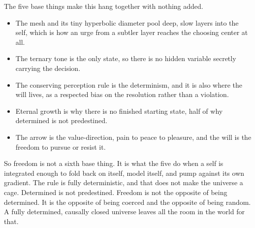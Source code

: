 The five base things make this hang together with nothing added.

\begin{itemize}
\item The mesh and its tiny hyperbolic diameter pool deep, slow layers into the self, which is how an urge from a subtler layer reaches the choosing center at all.
\item The ternary tone is the only state, so there is no hidden variable secretly carrying the decision.
\item The conserving perception rule is the determinism, and it is also where the will lives, as a respected bias on the resolution rather than a violation.
\item Eternal growth is why there is no finished starting state, half of why determined is not predestined.
\item The arrow is the value-direction, pain to peace to pleasure, and the will is the freedom to pursue or resist it.
\end{itemize}

So freedom is not a sixth base thing. It is what the five do when a self is integrated enough to fold back on itself, model itself, and pump against its own gradient. The rule is fully deterministic, and that does not make the universe a cage. Determined is not predestined. Freedom is not the opposite of being determined. It is the opposite of being coerced and the opposite of being random. A fully determined, causally closed universe leaves all the room in the world for that.
